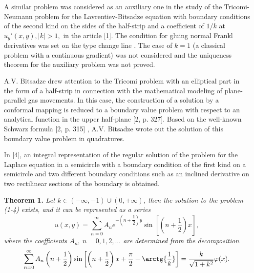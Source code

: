\documentclass[11pt,twoside]{article}
\begin{document}
	
	A similar problem was considered as an auxiliary one in the study of the Tricomi-Neumann problem
	for the Lavrentiev-Bitsadze equation with boundary conditions of the second kind on the sides
	of the half-strip and a coefficient of $1/k$ at
	$u_y'(x,y), \vert k\vert>1, $ in the article [1].
	The condition for gluing normal Frankl derivatives was set on the type change line
	. The case of $k=1$ (a classical problem with a continuous gradient)
	was not considered and the uniqueness theorem for the auxiliary problem
	was not proved.
	
	A.V. Bitsadze drew attention to the Tricomi problem with an elliptical part in the form of a half-strip
	in connection with the mathematical modeling of plane-parallel
	gas movements. In this case, the construction of a solution by a conformal mapping
	is reduced to a boundary value problem with respect to an analytical function in the upper
	half-plane [2, p. 327]. Based on the well-known Schwarz formula [2, p. 315]
	, A.V. Bitsadze wrote out the solution of this boundary value problem in quadratures. 
	
	In [4], an integral representation of the regular solution of the problem for the Laplace equation
	in a semicircle with a boundary condition of the first kind on a semicircle and two different
	boundary conditions such as an inclined derivative on two rectilinear sections of the boundary is obtained.
	\par
	\textbf{Theorem 1.} \textit{ Let $k\in (-\infty, -1)\cup (0, +\infty)$, then the solution to the problem (1-4) exists, and it can be represented as a series}
	\begin{equation}
		u(x,y) = \sum\limits_{n=0}^{\infty} A_n e^{-\left(n + \dfrac12\right)y} \sin{\left[\left(n + \dfrac12\right)x\right]},
	\end{equation}
	\textit{where the coefficients $A_n, \ n =0,1,2, \dots$ are determined from the decomposition}
	\begin{equation}
		\sum\limits_{n=0}^{\infty} A_n \left(n + \dfrac12 \right) \sin{\left[\left(n +\dfrac12\right)x +\dfrac{\pi}{2} - \arctg{\dfrac{1}{k}}\right]} = \dfrac{k}{\sqrt{1+k^2}} \varphi(x).
	\end{equation}
	
\end{document}
